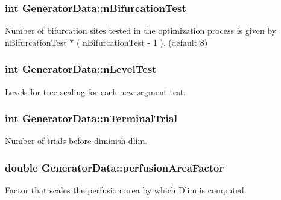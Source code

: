 \subsubsection[{\texorpdfstring{n\+Bifurcation\+Test}{nBifurcationTest}}]{\setlength{\rightskip}{0pt plus 5cm}int Generator\+Data\+::n\+Bifurcation\+Test}\hypertarget{class_generator_data_a3c848d7e7f5f26fdefe582709ca14eb4}{}\label{class_generator_data_a3c848d7e7f5f26fdefe582709ca14eb4}
Number of bifurcation sites tested in the optimization process is given by {\ttfamily n\+Bifurcation\+Test} $\ast$ ( {\ttfamily n\+Bifurcation\+Test} -\/ 1 ). (default 8) 
\subsubsection[{\texorpdfstring{n\+Level\+Test}{nLevelTest}}]{\setlength{\rightskip}{0pt plus 5cm}int Generator\+Data\+::n\+Level\+Test}\hypertarget{class_generator_data_a124d5f0d59bdcd90fcd69b640d9af05f}{}\label{class_generator_data_a124d5f0d59bdcd90fcd69b640d9af05f}
Levels for tree scaling for each new segment test. 
\subsubsection[{\texorpdfstring{n\+Terminal\+Trial}{nTerminalTrial}}]{\setlength{\rightskip}{0pt plus 5cm}int Generator\+Data\+::n\+Terminal\+Trial}\hypertarget{class_generator_data_a0f4cff730a9b1fb2b237fc4610da2ff0}{}\label{class_generator_data_a0f4cff730a9b1fb2b237fc4610da2ff0}
Number of trials before diminish dlim. 
\subsubsection[{\texorpdfstring{perfusion\+Area\+Factor}{perfusionAreaFactor}}]{\setlength{\rightskip}{0pt plus 5cm}double Generator\+Data\+::perfusion\+Area\+Factor}\hypertarget{class_generator_data_acc6d373f481e41d082eb6f63786804e3}{}\label{class_generator_data_acc6d373f481e41d082eb6f63786804e3}
Factor that scales the perfusion area by which Dlim is computed. 
